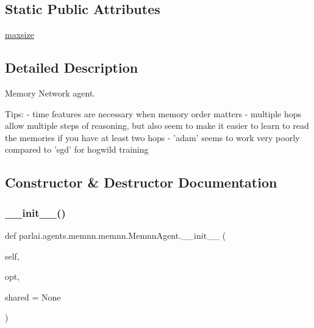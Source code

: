 \subsection*{Static Public Attributes}
\begin{DoxyCompactItemize}
\item 
\hyperlink{classparlai_1_1agents_1_1memnn_1_1memnn_1_1MemnnAgent_aff26270b3e93fc2c0a69a184774ec55e}{maxsize}
\end{DoxyCompactItemize}


\subsection{Detailed Description}
\begin{DoxyVerb}Memory Network agent.

Tips:
- time features are necessary when memory order matters
- multiple hops allow multiple steps of reasoning, but also seem to make it
    easier to learn to read the memories if you have at least two hops
- 'adam' seems to work very poorly compared to 'sgd' for hogwild training
\end{DoxyVerb}
 

\subsection{Constructor \& Destructor Documentation}
\mbox{\label{classparlai_1_1agents_1_1memnn_1_1memnn_1_1MemnnAgent_a256f911504285d19b006def388d0772f}} 
\subsubsection{\texorpdfstring{\+\_\+\+\_\+init\+\_\+\+\_\+()}{\_\_init\_\_()}}
{\footnotesize\ttfamily def parlai.\+agents.\+memnn.\+memnn.\+Memnn\+Agent.\+\_\+\+\_\+init\+\_\+\+\_\+ (\begin{DoxyParamCaption}\item[{}]{self,  }\item[{}]{opt,  }\item[{}]{shared = {\ttfamily None} }\end{DoxyParamCaption})}



